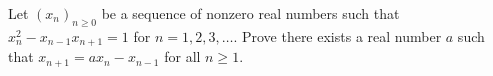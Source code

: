 Let $(x_n)_{n \geq 0}$ be a sequence of nonzero real numbers
such that $x_n^2 - x_{n-1}x_{n+1} = 1$ for $n=1,2,3,\dots$. Prove there
exists a real number $a$ such that $x_{n+1} = ax_n - x_{n-1}$ for all $n
\geq 1$.
